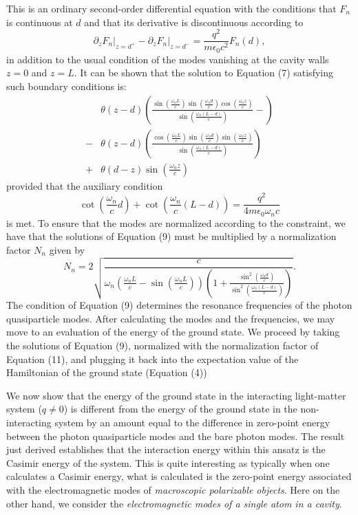 \documentclass[aps,prb,twocolumn,
	groupedaddress,superscriptaddress,
	amsfonts,amssymb,amsmath,floatfix,
	citeautoscript]{revtex4-1}
\begin{document}
This is an ordinary second-order differential equation with the conditions that $F_n$ is continuous at $d$ and that its derivative is discontinuous according to 
\begin{equation}
\partial_zF_n\Big|_{z=d^+}-\partial_zF_n\Big|_{z=d^-} = \frac{q^2}{m\epsilon_0 c^2}F_n(d),
\end{equation}
in addition to the usual condition of the modes vanishing at the cavity walls $z=0$ and $z=L$. It can be shown that the solution to Equation (7) satisfying such boundary conditions is:
\begin{align}
&\theta (z-d) \left(\frac{\sin\left(\frac{\omega_nL}{c}\right)\sin\left(\frac{\omega_nd}{c}\right)\cos\left(\frac{\omega_nz}{c}\right)}{\sin\left(\frac{\omega_n(L-d)}{c}\right)}-\right) \nonumber \\ 
-&\theta (z-d) \left(\frac{\cos\left(\frac{\omega_nL}{c}\right)\sin\left(\frac{\omega_nd}{c}\right)\sin\left(\frac{\omega_nz}{c}\right)}{\sin\left(\frac{\omega_n(L-d)}{c}\right)}\right) \nonumber \\ 
+&\theta (d-z) \sin\left(\frac{\omega_n z}{c} \right)
\end{align}
provided that the auxiliary condition
\begin{equation}
\cot\left(\frac{\omega_n}{c}d \right)+\cot\left(\frac{\omega_n}{c}(L-d) \right) = \frac{q^2}{4m\epsilon_0\omega_nc}
\end{equation}
is met. To ensure that the modes are normalized according to the constraint, we have that the solutions of Equation (9) must be multiplied by a normalization factor $N_n$ given by
\begin{equation}
N_n = 2\sqrt{\frac{c}{\omega_n\left(\frac{\omega_nL}{c}-\sin\left(\frac{\omega_nL}{c}\right) \right)\left(1+\frac{\sin^2\left(\frac{\omega_nd}{c}\right)}{\sin^2\left(\frac{\omega_n(L-d)}{c}\right)} \right)}}.
\end{equation}
The condition of Equation (9) determines the resonance frequencies of the photon quasiparticle modes. After calculating the modes and the frequencies, we may move to an evaluation of the energy of the ground state. We proceed by taking the solutions of Equation (9), normalized with the normalization factor of Equation (11), and plugging it back into the expectation value of the Hamiltonian of the ground state (Equation (4))

We now show that the energy of the ground state in the interacting light-matter system ($q \neq 0$) is different from the energy of the ground state in the non-interacting system by an amount equal to the difference in zero-point energy between the photon quasiparticle modes and the bare photon modes.  The result just derived establishes that the interaction energy within this ansatz is the Casimir energy of the system. This is quite interesting as typically when one calculates a Casimir energy, what is calculated is the zero-point energy associated with the electromagnetic modes of \textit{macroscopic polarizable objects}. Here on the other hand, we consider the \textit{electromagnetic modes of a single atom in a cavity}.
\end{document}
